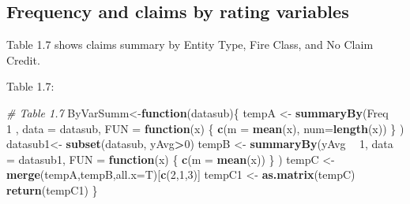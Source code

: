 \documentclass[]{book}
\newenvironment{Shaded}{\begin{snugshade}}{\end{snugshade}}
\newcommand{\KeywordTok}[1]{\textcolor[rgb]{0.13,0.29,0.53}{\textbf{#1}}}
\newcommand{\DataTypeTok}[1]{\textcolor[rgb]{0.13,0.29,0.53}{#1}}
\newcommand{\DecValTok}[1]{\textcolor[rgb]{0.00,0.00,0.81}{#1}}
\newcommand{\StringTok}[1]{\textcolor[rgb]{0.31,0.60,0.02}{#1}}
\newcommand{\CommentTok}[1]{\textcolor[rgb]{0.56,0.35,0.01}{\textit{#1}}}
\newcommand{\ControlFlowTok}[1]{\textcolor[rgb]{0.13,0.29,0.53}{\textbf{#1}}}
\newcommand{\OperatorTok}[1]{\textcolor[rgb]{0.81,0.36,0.00}{\textbf{#1}}}
\newcommand{\NormalTok}[1]{#1}
\theoremstyle{definition}
\theoremstyle{definition}
\theoremstyle{definition}
\theoremstyle{remark}
\begin{document}
\subsection{Frequency and claims by rating
variables}\label{frequency-and-claims-by-rating-variables}

Table 1.7 shows claims summary by Entity Type, Fire Class, and No Claim
Credit.

Table 1.7:

\begin{Shaded}
\begin{Highlighting}[]
\CommentTok{# Table 1.7}
\NormalTok{ByVarSumm<-}\ControlFlowTok{function}\NormalTok{(datasub)\{}
\NormalTok{  tempA <-}\StringTok{ }\KeywordTok{summaryBy}\NormalTok{(Freq    }\OperatorTok{~}\StringTok{ }\DecValTok{1}\NormalTok{ , }\DataTypeTok{data =}\NormalTok{ datasub,   }
                     \DataTypeTok{FUN =} \ControlFlowTok{function}\NormalTok{(x) \{ }\KeywordTok{c}\NormalTok{(}\DataTypeTok{m =} \KeywordTok{mean}\NormalTok{(x), }\DataTypeTok{num=}\KeywordTok{length}\NormalTok{(x)) \} )}
\NormalTok{  datasub1<-}\StringTok{  }\KeywordTok{subset}\NormalTok{(datasub, yAvg}\OperatorTok{>}\DecValTok{0}\NormalTok{)}
\NormalTok{  tempB <-}\StringTok{ }\KeywordTok{summaryBy}\NormalTok{(yAvg   }\OperatorTok{~}\StringTok{ }\DecValTok{1}\NormalTok{, }\DataTypeTok{data =}\NormalTok{ datasub1,}
                     \DataTypeTok{FUN =} \ControlFlowTok{function}\NormalTok{(x) \{ }\KeywordTok{c}\NormalTok{(}\DataTypeTok{m =} \KeywordTok{mean}\NormalTok{(x)) \} )}
\NormalTok{  tempC <-}\StringTok{ }\KeywordTok{merge}\NormalTok{(tempA,tempB,}\DataTypeTok{all.x=}\NormalTok{T)[}\KeywordTok{c}\NormalTok{(}\DecValTok{2}\NormalTok{,}\DecValTok{1}\NormalTok{,}\DecValTok{3}\NormalTok{)]}
\NormalTok{  tempC1 <-}\StringTok{ }\KeywordTok{as.matrix}\NormalTok{(tempC)}
  \KeywordTok{return}\NormalTok{(tempC1)}
\NormalTok{\}}


\end{Highlighting}
\end{Shaded}
\end{document}
